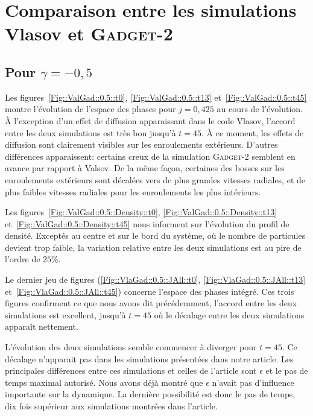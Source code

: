 	\section{Comparaison entre les simulations Vlasov et \textsc{Gadget-2}}
		\subsection{Pour $\gamma = -0,5$}

		Les figures~\ref{Fig::ValGad::0.5::t0}, \ref{Fig::ValGad::0.5::t13} et~\ref{Fig::ValGad::0.5::t45} montre l'évolution de l'espace des
		phases pour $j=0,425$ au cours de l'évolution. À l'exception d'un effet de diffusion apparaissant dans le code Vlasov, l'accord entre
		les deux simulations est très bon jusqu'à $t=45$. À ce moment, les effets de diffusion sont clairement visibles sur les enroulements
		extérieurs. D'autres différences apparaissent: certains creux de la simulation \textsc{Gadget-2} semblent en avance par rapport à
		Valsov. De la même façon, certaines des bosses sur les enroulements extérieurs sont décalées vers de plus grandes vitesses radiales,
		et de plus faibles vitesses radiales pour les enroulements les plus intérieurs. 

		Les figures~\ref{Fig::ValGad::0.5::Density::t0}, \ref{Fig::ValGad::0.5::Density::t13} et~\ref{Fig::ValGad::0.5::Density::t45} nous
		informent sur l'évolution du profil de densité. Exceptés au centre et sur le bord du système, où le nombre de particules devient trop
		faible, la variation relative entre les deux simulations est au pire de l'ordre de $25\%$.

		Le dernier jeu de figures (\ref{Fig::VlaGad::0.5::JAll::t0}, \ref{Fig::VlaGad::0.5::JAll::t13} et~\ref{Fig::VlaGad::0.5::JAll::t45})
		concerne l'espace des phases intégré. Ces trois figures confirment ce que nous avons dit précédemment, l'accord entre les deux
		simulations est excellent, jusqu'à $t=45$ où le décalage entre les deux simulations apparaît nettement.
			
		L'évolution des deux simulations semble commencer à diverger pour $t=45$. Ce décalage n'apparait pas dans les simulations présentées
		dans notre article. Les principales différences entre ces simulations et celles de l'article sont $\epsilon$ et le pas de temps
		maximal autorisé. Nous avons déjà montré que $\epsilon$ n'avait pas d'influence importante sur la dynamique. La dernière possibilité
		est donc le pas de temps, dix fois supérieur aux simulations montrées dans l'article.

